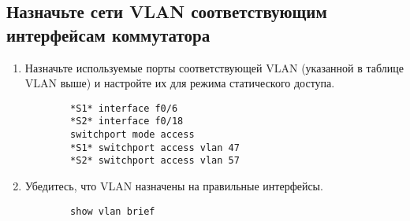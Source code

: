 \subsection{Назначьте сети VLAN соответствующим интерфейсам коммутатора}
\begin{enumerate}[a]
    \item Назначьте используемые порты соответствующей VLAN (указанной в таблице VLAN выше) и
    настройте их для режима статического доступа.
    \begin{verbatim}
        *S1* interface f0/6
        *S2* interface f0/18
        switchport mode access
        *S1* switchport access vlan 47
        *S2* switchport access vlan 57
    \end{verbatim}

    \item Убедитесь, что VLAN назначены на правильные интерфейсы.
    \begin{verbatim}
        show vlan brief
    \end{verbatim}
\end{enumerate}